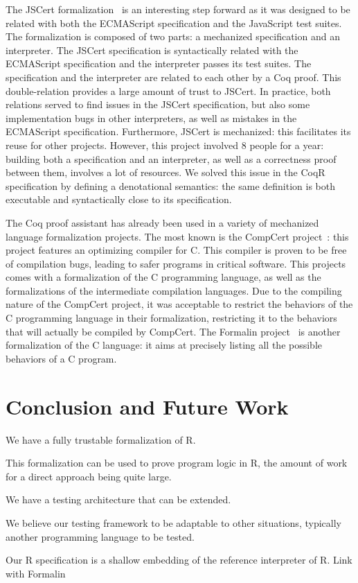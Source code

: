 \documentclass[
    sigplan,
    10pt,
    review, %
    natbib=false %
 ]{acmart}
\begin{document}
The JSCert formalization~\parencite{popl14jscert}
is an interesting step forward as it was designed
to be related with both the ECMAScript specification and the JavaScript test suites.
The formalization is composed of two parts:
a mechanized specification and an interpreter.
The JSCert specification is syntactically related with the ECMAScript specification
and the interpreter passes its test suites.
The specification and the interpreter are related to each other by a Coq proof.
This double-relation provides a large amount of trust to JSCert.
In practice, both relations served to find issues in the JSCert specification,
but also some implementation bugs in other interpreters,
as well as mistakes in the ECMAScript specification.
Furthermore, JSCert is mechanized:
this facilitates its reuse for other projects.
However, this project involved 8 people for a year:
building both a specification and an interpreter,
as well as a correctness proof between them, involves a lot of resources.
We solved this issue in the CoqR specification
by defining a denotational semantics:
the same definition is both executable and syntactically close to its specification.

The Coq proof assistant has already been used
in a variety of mechanized language formalization projects.
The most known is the CompCert project~\cite{Leroy-Compcert-CACM}:
this project features an optimizing compiler for C.
This compiler is proven to be free of compilation bugs,
leading to safer programs in critical software.
This projects comes with a formalization of the C programming language,
as well as the formalizations of the intermediate compilation languages.
%
Due to the compiling nature of the CompCert project,
it was acceptable to restrict the behaviors of the C programming language
in their formalization,
restricting it to the behaviors that will actually be compiled by CompCert.
The Formalin project~\parencite{formalin} is another formalization
of the C language:
it aims at precisely listing all the possible behaviors of a C program.

\section{Conclusion and Future Work}
\label{sec:conclusion}

\todo{}

We have a fully trustable formalization of R.

This formalization can be used to prove program logic in R,
the amount of work for a direct approach being quite large.

We have a testing architecture that can be extended.

We believe our testing framework to be adaptable to other situations,
typically another programming language to be tested.

Our R specification is a shallow embedding of the reference interpreter of R.
Link with Formalin

\printbibliography{}
\end{document}
